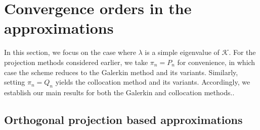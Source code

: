 \documentclass[pdflatex, sn-mathphys-num]{sn-jnl}%
\theoremstyle{thmstyleone}%
\theoremstyle{thmstyletwo}%
\theoremstyle{thmstylethree}%
\begin{document}

\section{Convergence orders in the approximations}

In this section, we focus on the case where $\lambda$ is a simple eigenvalue of $\mathcal{K}$. 
For the projection methods considered earlier, we take $\pi_n = P_n$ for convenience, 
in which case the scheme reduces to the Galerkin method and its variants. 
Similarly, setting $\pi_n = Q_n$ yields the collocation method and its variants. 
Accordingly, we establish our main results for both the Galerkin and collocation methods..

\subsection{Orthogonal projection based approximations}
\end{document}
